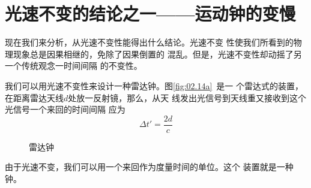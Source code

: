 \section{光速不变的结论之一——运动钟的变慢}\label{sec:02.07}

现在我们来分析，从光速不变性能得出什么结论。光速不变
性使我们所看到的物理现象总是因果相继的，免除了因果倒置的
混乱。但是，光速不变性却动摇了另一个传统观念一时间间隔
的不变性。

我们可以用光速不变性来设计一种雷达钟。图\ref{fig:02.14a}~是一
个雷达式的装置，在距离雷达天线$d$处放一反射镜，那么，从天
线发出光信号到天线重又接收到这个光信号一个来回的时间间隔
应为
\begin{equation*}
  \Delta t ' = \frac { 2 d } { c }
\end{equation*}
\begin{figure}[!h]
  \centering
  \quad
  \caption{雷达钟}
  \label{fig:02.14}
\end{figure}

由于光速不变，我们可以用一个来回作为度量时间的单位。这个
装置就是一种钟。

